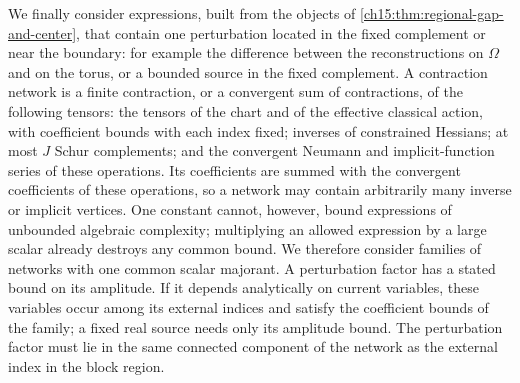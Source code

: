 We finally consider expressions, built from the objects of \cref{ch15:thm:regional-gap-and-center}, that contain one perturbation located in the fixed complement or near the boundary: for example the difference between the reconstructions on $\Omega$ and on the torus, or a bounded source in the fixed complement. A contraction network is a finite contraction, or a convergent sum of contractions, of the following tensors: the tensors of the chart and of the effective classical action, with coefficient bounds with each index fixed; inverses of constrained Hessians; at most $J$ Schur complements; and the convergent Neumann and implicit-function series of these operations. Its coefficients are summed with the convergent coefficients of these operations, so a network may contain arbitrarily many inverse or implicit vertices. One constant cannot, however, bound expressions of unbounded algebraic complexity; multiplying an allowed expression by a large scalar already destroys any common bound. We therefore consider families of networks with one common scalar majorant. A perturbation factor has a stated bound on its amplitude. If it depends analytically on current variables, these variables occur among its external indices and satisfy the coefficient bounds of the family; a fixed real source needs only its amplitude bound. The perturbation factor must lie in the same connected component of the network as the external index in the block region.

